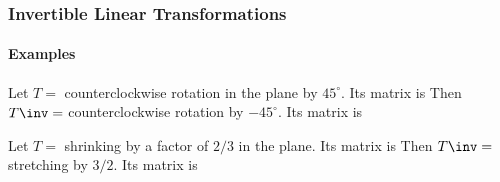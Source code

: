 
\begin{frame}
\frametitle{Invertible Linear Transformations}
\framesubtitle{Examples}

\displayskips{4pt}
Let $T = $ counterclockwise rotation in the plane by $45^\circ$.  Its matrix is
\webonlycmd{
\[ A = \mat{\cos(45^\circ) -\sin(45^\circ) ; \sin(45^\circ) \cos(45^\circ)}
= \frac 1{\sqrt 2}\mat{1 -1; 1 1}. \]}%
Then $T\inv = $ counterclockwise rotation by $-45^\circ$.  Its matrix is
\webonlycmd{
\[ B = \mat{\cos(-45^\circ) -\sin(-45^\circ) ; \sin(-45^\circ) \cos(-45^\circ)}
= \frac 1{\sqrt 2}\mat{1 1; -1 1}. \]}%
\hfill
{}
\hfill\null

\pause\medskip
Let $T = $ shrinking by a factor of $2/3$ in the plane.  Its matrix is
\webonlycmd{
\[ A = \mat{2/3 0; 0 2/3} \]}%
Then $T\inv = $ stretching by $3/2$.  Its matrix is
\webonlycmd{
\[ B = \mat{3/2 0; 0 3/2} \]}%
\hfill
{}
\hfill\null

\end{frame}



